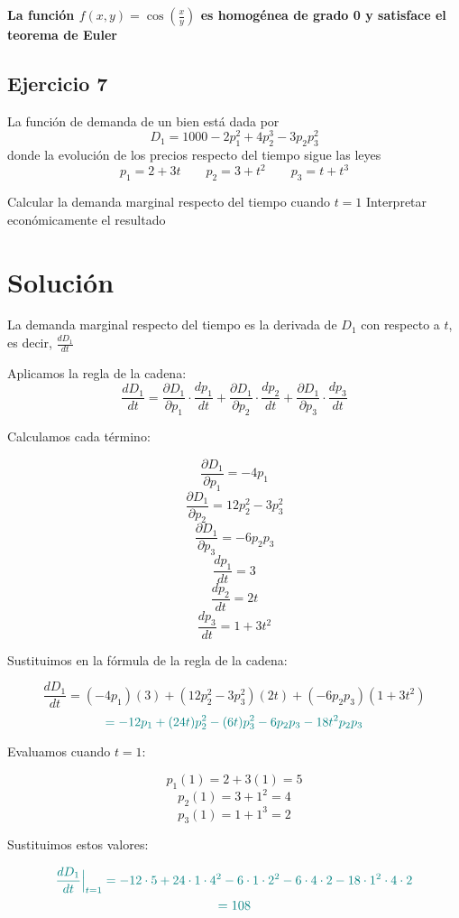 \documentclass{article}
\begin{document}
\textbf{\color{teal}La función \(f(x,y) = \cos\left(\frac{x}{y}\right)\) es homogénea de grado 0 y satisface el teorema de Euler}


\newpage
\subsection{Ejercicio 7}
La función de demanda de un bien está dada por
\[
D_1 = 1000 - 2p_1^2 + 4p_2^3 - 3p_2p_3^2
\]
donde la evolución de los precios respecto del tiempo sigue las leyes
\[
p_1 = 2 + 3t
\qquad
p_2 = 3 + t^2
\qquad
p_3 = t + t^3
\]

Calcular la demanda marginal respecto del tiempo cuando \(t = 1\)  
Interpretar económicamente el resultado

\newpage
\section*{Solución}

La demanda marginal respecto del tiempo es la derivada de \(D_1\) con respecto a \(t\), es decir, \(\frac{dD_1}{dt}\)

Aplicamos la regla de la cadena:
\[
\frac{dD_1}{dt} = \frac{\partial D_1}{\partial p_1} \cdot \frac{dp_1}{dt} + \frac{\partial D_1}{\partial p_2} \cdot \frac{dp_2}{dt} + \frac{\partial D_1}{\partial p_3} \cdot \frac{dp_3}{dt}
\]

Calculamos cada término:

\[
\frac{\partial D_1}{\partial p_1} = -4p_1
\]
\[
\frac{\partial D_1}{\partial p_2} = 12p_2^2 - 3p_3^2
\]
\[
\frac{\partial D_1}{\partial p_3} = -6p_2p_3
\]
\[
\frac{dp_1}{dt} = 3
\]
\[
\frac{dp_2}{dt} = 2t
\]
\[
\frac{dp_3}{dt} = 1 + 3t^2
\]

Sustituimos en la fórmula de la regla de la cadena:

\[
\frac{dD_1}{dt} = (-4p_1)(3) + (12p_2^2 - 3p_3^2)(2t) + (-6p_2p_3)(1 + 3t^2)
\]
\[
\color{teal}
= -12p_1 + (24t)p_2^2 - (6t)p_3^2 - 6p_2p_3 - 18t^2p_2p_3
\]

Evaluamos cuando \(t = 1\):

\[
p_1(1) = 2 + 3(1) = 5
\]
\[
p_2(1) = 3 + 1^2 = 4
\]
\[
p_3(1) = 1 + 1^3 = 2
\]

Sustituimos estos valores:

\[
\color{teal}
\frac{dD_1}{dt}\Big|_{t=1} = -12 \cdot 5 + 24 \cdot 1 \cdot 4^2 - 6 \cdot 1 \cdot 2^2 - 6 \cdot 4 \cdot 2 - 18 \cdot 1^2 \cdot 4 \cdot 2
\]
\[
\color{teal}
= 108
\]

\bigskip
\end{document}
